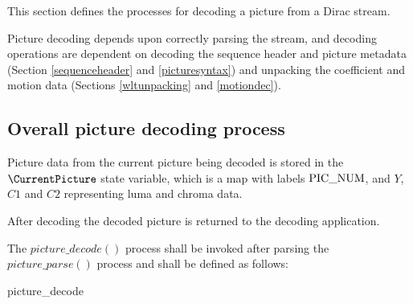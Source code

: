 
\label{picturedec}

This section defines the processes for decoding a picture from a Dirac stream.

Picture decoding depends upon correctly parsing the stream, and decoding operations
 are dependent on decoding the sequence header and picture metadata 
(Section \ref{sequenceheader} and \ref{picturesyntax}) and unpacking the coefficient 
and motion data (Sections \ref{wltunpacking} and \ref{motiondec}).

\subsection{Overall picture decoding process}
\label{overallpicturedec}

Picture data from the current picture being decoded is stored in the $\CurrentPicture$ state
variable, which is a map with labels $\text{PIC\_NUM}$, and $Y$, $C1$ and $C2$ representing
luma and chroma data.

After decoding the decoded picture is returned to the decoding application.

The $picture\_decode()$ process shall be invoked after parsing the $picture\_parse()$ process and shall be defined as follows:

\begin{pseudo}{picture\_decode}{}
\bsCODE{\CurrentPicture=\{\}}
\bsCODE{\CurrentPicture[\PicNum]=\PictureNumber}
\bsEND
\bsIF{\ZeroResidual==\false}
\bsELSE
\bsEND
{}
    \bsEND
\bsEND
{}
\bsEND
{}
\bsRET{\CurrentPicture}
\end{pseudo}


